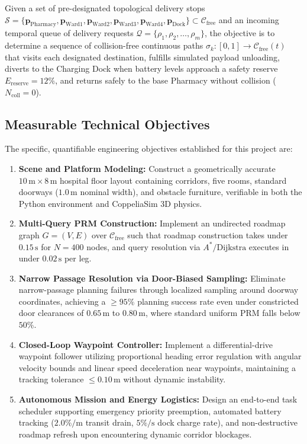 \documentclass[12pt,a4paper]{article}
\begin{document}
Given a set of pre-designated topological delivery stops $\mathcal{S} = \{ \mathbf{p}_{\text{Pharmacy}}, \mathbf{p}_{\text{Ward1}}, \mathbf{p}_{\text{Ward2}}, \mathbf{p}_{\text{Ward3}}, \mathbf{p}_{\text{Ward4}}, \mathbf{p}_{\text{Dock}} \} \subset \mathcal{C}_{\text{free}}$ and an incoming temporal queue of delivery requests $\mathcal{Q} = \{ \rho_1, \rho_2, \dots, \rho_m \}$, the objective is to determine a sequence of collision-free continuous paths $\sigma_k: [0, 1] \rightarrow \mathcal{C}_{\text{free}}(t)$ that visits each designated destination, fulfills simulated payload unloading, diverts to the Charging Dock when battery levels approach a safety reserve $E_{\text{reserve}} = 12\%$, and returns safely to the base Pharmacy without collision ($N_{\text{coll}} = 0$).

\subsection{Measurable Technical Objectives}
The specific, quantifiable engineering objectives established for this project are:
\begin{enumerate}[itemsep=2pt,topsep=2pt]
\item \textbf{Scene and Platform Modeling:} Construct a geometrically accurate $10\,\text{m} \times 8\,\text{m}$ hospital floor layout containing corridors, five rooms, standard doorways ($1.0\,\text{m}$ nominal width), and obstacle furniture, verifiable in both the Python environment and CoppeliaSim 3D physics.
\item \textbf{Multi-Query PRM Construction:} Implement an undirected roadmap graph $G = (V, E)$ over $\mathcal{C}_{\text{free}}$ such that roadmap construction takes under $0.15\,\text{s}$ for $N = 400$ nodes, and query resolution via $A^*/\text{Dijkstra}$ executes in under $0.02\,\text{s}$ per leg.
\item \textbf{Narrow Passage Resolution via Door-Biased Sampling:} Eliminate narrow-passage planning failures through localized sampling around doorway coordinates, achieving a $\geq 95\%$ planning success rate even under constricted door clearances of $0.65\,\text{m}$ to $0.80\,\text{m}$, where standard uniform PRM falls below $50\%$.
\item \textbf{Closed-Loop Waypoint Controller:} Implement a differential-drive waypoint follower utilizing proportional heading error regulation with angular velocity bounds and linear speed deceleration near waypoints, maintaining a tracking tolerance $\leq 0.10\,\text{m}$ without dynamic instability.
\item \textbf{Autonomous Mission and Energy Logistics:} Design an end-to-end task scheduler supporting emergency priority preemption, automated battery tracking ($2.0\%/\text{m}$ transit drain, $5\%/\text{s}$ dock charge rate), and non-destructive roadmap refresh upon encountering dynamic corridor blockages.
\end{enumerate}
\end{document}
